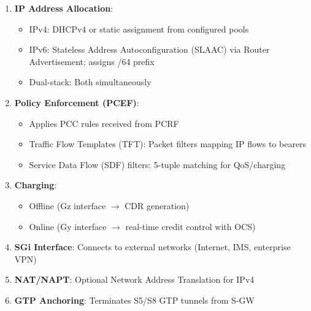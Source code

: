 
\begin{enumerate}
\def\labelenumi{\arabic{enumi}.}
\tightlist
\item
  \textbf{IP Address Allocation}:

  \begin{itemize}
  \tightlist
  \item
    IPv4: DHCPv4 or static assignment from configured pools
  \item
    IPv6: Stateless Address Autoconfiguration (SLAAC) via Router Advertisement; assigns /\allowbreak{}64 prefix
  \item
    Dual-stack: Both simultaneously
  \end{itemize}
\item
  \textbf{Policy Enforcement (PCEF)}:

  \begin{itemize}
  \tightlist
  \item
    Applies PCC rules received from PCRF
  \item
    Traffic Flow Templates (TFT): Packet filters mapping IP flows to bearers
  \item
    Service Data Flow (SDF) filters: 5-tuple matching for QoS/\allowbreak{}charging
  \end{itemize}
\item
  \textbf{Charging}:

  \begin{itemize}
  \tightlist
  \item
    Offline (Gz interface \ensuremath{\to} CDR generation)
  \item
    Online (Gy interface \ensuremath{\to} real-time credit control with OCS)
  \end{itemize}
\item
  \textbf{SGi Interface}: Connects to external networks (Internet, IMS, enterprise VPN)
\item
  \textbf{NAT/\allowbreak{}NAPT}: Optional Network Address Translation for IPv4
\item
  \textbf{GTP Anchoring}: Terminates S5/\allowbreak{}S8 GTP tunnels from S-GW
\end{enumerate}



